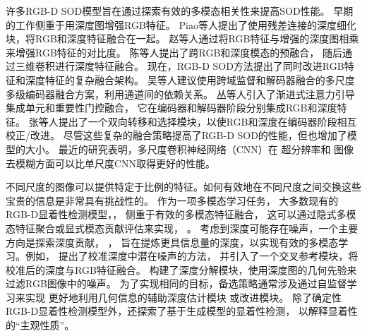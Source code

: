 许多RGB-D SOD模型旨在通过探索有效的多模态相关性来提高SOD性能。
早期的工作侧重于用深度图增强RGB特征。
Piao等人提出了使用残差连接的深度细化块，将RGB和深度特征融合在一起。
赵等人通过将RGB特征与增强的深度图相乘来增强RGB特征的对比度。
陈等人提出了跨RGB和深度模态的预融合，
随后通过三维卷积进行深度特征融合。
现在，RGB-D SOD方法提出了同时改进RGB特征和深度特征的复杂融合架构。
吴等人建议使用跨域监督和解码器融合的多尺度多级编码器融合方案，利用通道间的依赖关系。
丛等人引入了渐进式注意力引导集成单元和重要性门控融合，
它在编码器和解码器阶段分别集成RGB和深度特征。
张等人提出了一个双向转移和选择模块，以使RGB和深度在编码器阶段相互校正/改进。
尽管这些复杂的融合策略提高了RGB-D SOD的性能，但也增加了模型的大小。
最近的研究表明，多尺度卷积神经网络（CNN）在
超分辨率和
图像去模糊方面可以比单尺度CNN取得更好的性能。




不同尺度的图像可以提供特定于比例的特征。如何有效地在不同尺度之间交换这些宝贵的信息是非常具有挑战性的。
作为一项多模态学习任务，
大多数现有的RGB-D显着性检测模型，，
侧重于有效的多模态特征融合，
这可以通过隐式多模态特征聚合或显式模态贡献评估来实现，
。
考虑到深度可能存在噪声，一个主要方向是探索深度贡献，
，
旨在提炼更具信息量的深度，以实现有效的多模态学习。例如，
提出了校准深度中潜在噪声的方法，
并引入了一个交叉参考模块，将校准后的深度与RGB特征融合。
构建了深度分解模块，使用深度图的几何先验来过滤RGB图像中的噪声。
为了实现相同的目标，备选策略通常涉及通过自监督学习来实现
更好地利用几何信息的辅助深度估计模块
或改进模块。
除了确定性RGB-D显着性检测模型外，还探索了基于生成模型的显着性检测，
以解释显着性的“主观性质”。






\label{chpt1:title:lf_methods}


